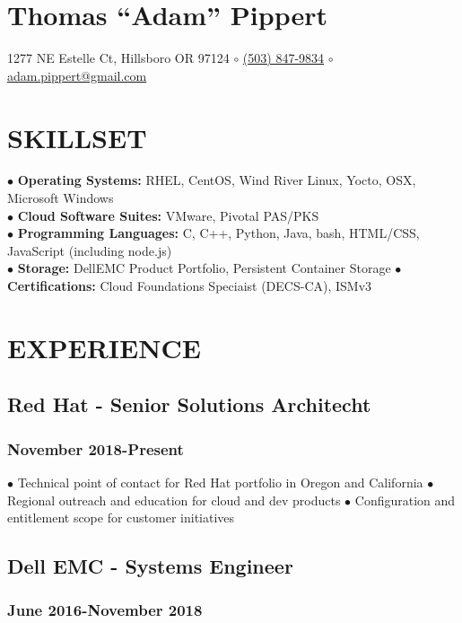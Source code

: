 \documentclass{article}
\begin{document}
\section*{Thomas ``Adam'' Pippert}
1277 NE Estelle Ct, Hillsboro OR 97124 $\circ$
\href{tel:+15038479834}{(503) 847-9834} $\circ$
\href{mailto:adam.pippert@gmail.com}{adam.pippert@gmail.com}

\section*{SKILLSET}


$\bullet$ \textbf{Operating Systems:} RHEL, CentOS, Wind River Linux, Yocto, OSX, Microsoft Windows\\
$\bullet$ \textbf{Cloud Software Suites:} VMware, Pivotal PAS/PKS\\
$\bullet$ \textbf{Programming Languages:} C, C++, Python, Java, bash, HTML/CSS, JavaScript (including node.js)\\
$\bullet$ \textbf{Storage:} DellEMC Product Portfolio, Persistent Container Storage
$\bullet$ \textbf{Certifications:} Cloud Foundations Speciaist (DECS-CA), ISMv3 


\section*{EXPERIENCE}

\subsection*{Red Hat - Senior Solutions Architecht}
\subsubsection*{November 2018-Present}

$\bullet$ Technical point of contact for Red Hat portfolio in Oregon and California
$\bullet$ Regional outreach and education for cloud and dev products
$\bullet$ Configuration and entitlement scope for customer initiatives

\subsection*{Dell EMC - Systems Engineer}
\subsubsection*{June 2016-November 2018}
\end{document}
